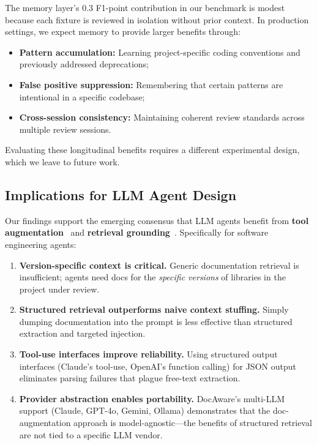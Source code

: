 \documentclass[sigconf,nonacm]{acmart}
\begin{document}
The memory layer's 0.3 F1-point contribution in our benchmark is modest because each fixture is reviewed in isolation without prior context. In production settings, we expect memory to provide larger benefits through:

\begin{itemize}
    \item \textbf{Pattern accumulation:} Learning project-specific coding conventions and previously addressed deprecations;
    \item \textbf{False positive suppression:} Remembering that certain patterns are intentional in a specific codebase;
    \item \textbf{Cross-session consistency:} Maintaining coherent review standards across multiple review sessions.
\end{itemize}

Evaluating these longitudinal benefits requires a different experimental design, which we leave to future work.

\subsection{Implications for LLM Agent Design}

Our findings support the emerging consensus that LLM agents benefit from \textbf{tool augmentation}~\cite{schick2023toolformer} and \textbf{retrieval grounding}~\cite{lewis2020rag}. Specifically for software engineering agents:

\begin{enumerate}
    \item \textbf{Version-specific context is critical.} Generic documentation retrieval is insufficient; agents need docs for the \emph{specific versions} of libraries in the project under review.
    \item \textbf{Structured retrieval outperforms naive context stuffing.} Simply dumping documentation into the prompt is less effective than structured extraction and targeted injection.
    \item \textbf{Tool-use interfaces improve reliability.} Using structured output interfaces (Claude's tool-use, OpenAI's function calling) for JSON output eliminates parsing failures that plague free-text extraction.
    \item \textbf{Provider abstraction enables portability.} DocAware's multi-LLM support (Claude, GPT-4o, Gemini, Ollama) demonstrates that the doc-augmentation approach is model-agnostic---the benefits of structured retrieval are not tied to a specific LLM vendor.
\end{enumerate}
\end{document}

